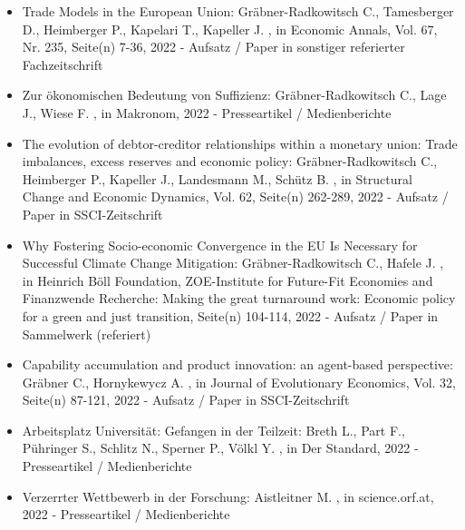 \begin{itemize}
	 \item Trade Models in the European Union: Gräbner-Radkowitsch C., Tamesberger D., Heimberger P., Kapelari T., Kapeller J. , in Economic Annals, Vol. 67, Nr. 235, Seite(n) 7-36, 2022 - Aufsatz / Paper in sonstiger referierter Fachzeitschrift
	 \item Zur ökonomischen Bedeutung von Suffizienz: Gräbner-Radkowitsch C., Lage J., Wiese F. , in Makronom, 2022 - Presseartikel / Medienberichte
	 \item The evolution of debtor-creditor relationships within a monetary union: Trade imbalances, excess reserves and economic policy: Gräbner-Radkowitsch C., Heimberger P., Kapeller J., Landesmann M., Schütz B. , in Structural Change and Economic Dynamics, Vol. 62, Seite(n) 262-289, 2022 - Aufsatz / Paper in SSCI-Zeitschrift
	 \item Why Fostering Socio-economic Convergence in the EU Is Necessary for Successful Climate Change Mitigation: Gräbner-Radkowitsch C., Hafele J. , in Heinrich Böll Foundation, ZOE-Institute for Future-Fit Economies and Finanzwende Recherche: Making the great turnaround work: Economic policy for a green and just transition, Seite(n) 104-114, 2022 - Aufsatz / Paper in Sammelwerk (referiert)
	 \item Capability accumulation and product innovation: an agent-based perspective: Gräbner C., Hornykewycz A. , in Journal of Evolutionary Economics, Vol. 32, Seite(n) 87-121, 2022 - Aufsatz / Paper in SSCI-Zeitschrift
	 \item Arbeitsplatz Universität: Gefangen in der Teilzeit: Breth L., Part F., Pühringer S., Schlitz N., Sperner P., Völkl Y. , in Der Standard, 2022 - Presseartikel / Medienberichte
	 \item Verzerrter Wettbewerb in der Forschung: Aistleitner M. , in science.orf.at, 2022 - Presseartikel / Medienberichte
\end{itemize} 
